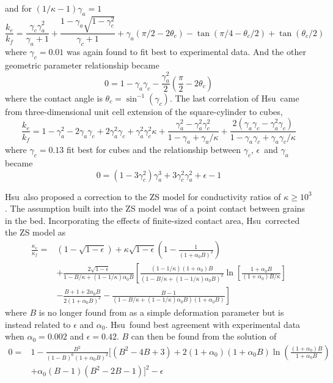 and for $(1/\kappa-1)\gamma_a=1$
\begin{equation}
    \frac{k_e}{k_f} = \frac{\gamma_c\gamma_a^2}{\gamma_a+1}+\frac{1-\gamma_a\sqrt{1-\gamma_c^2}}{\gamma_c+1}+\gamma_a(\pi/2-2\theta_c)-\tan(\pi/4-\theta_c/2)+\tan(\theta_c/2)
\end{equation}
where $\gamma_c = 0.01$ was again found to fit best to experimental data. And the other geometric parameter relationship became
\begin{equation}
    0 = 1-\gamma_a\gamma_c-\frac{\gamma_a^2}{2}\left(\frac{\pi}{2}-2\theta_c\right)
\end{equation}
where the contact angle is $\theta_c = \sin^{-1}(\gamma_c)$.
The last correlation of Hsu\etal~came from three-dimensional unit cell extension of the square-cylinder to cubes,
\begin{equation}
    \frac{k_e}{k_f} = 1-\gamma_a^2 - 2\gamma_a\gamma_c + 2\gamma_a^2\gamma_c + \gamma_a^2\gamma_c^2\kappa + \frac{\gamma_a^2-\gamma_a^2\gamma_c^2}{1-\gamma_a + \gamma_a/\kappa} + \frac{2(\gamma_a\gamma_c - \gamma_a^2\gamma_c)}{1-\gamma_a\gamma_c+\gamma_a\gamma_c/\kappa}
\end{equation}
where $\gamma_c = 0.13$ fit best for cubes and the relationship between $\gamma_c$, $\epsilon$\ and $\gamma_a$ became
\begin{equation}
    0 = (1-3\gamma_c^2)\gamma_a^3 + 3\gamma_c^2\gamma_a^2 + \epsilon - 1
\end{equation}

Hsu\etal~also proposed a correction to the ZS model for conductivity ratios of $\kappa \ge 10^3$. The assumption built into the ZS model was of a point contact between grains in the bed. Incorporating the effects of finite-sized contact area, Hsu\etal~corrected the ZS model as
\begin{equation}
\begin{split}
    \frac{\kappa_e}{\kappa_f}={} &(1-\sqrt{1-\epsilon}) + \kappa\sqrt{1-\epsilon}\left(1-\frac{1}{(1+\alpha_0B)^2}\right) \\
    & + \frac{2\sqrt{1-\epsilon}}{1-B/\kappa + (1-1/\kappa)\alpha_0B}\left[\frac{(1-1/\kappa)(1+\alpha_0)B}{(1-B/\kappa + (1-1/\kappa)\alpha_0B)^2}\ln\left[\frac{1+\alpha_0B}{(1+\alpha_0)B/\kappa}\right] \right.\\
    & - \left.\frac{B+1+2\alpha_0B}{2(1+\alpha_0B)^2} - \frac{B-1}{(1-B/\kappa+(1-1/\kappa)\alpha_0B)(1+\alpha_0B)} \right]
\end{split}
\end{equation}
where $B$ is no longer found from as a simple deformation parameter but is instead related to $\epsilon$ and $\alpha_0$. Hsu\etal~found best agreement with experimental data when $\alpha_0 = 0.002$ and $\epsilon=0.42$. $B$ can then be found from the solution of
\begin{equation}
\begin{split}
    0 ={} & 1-\frac{B^2}{(1-B)^6(1+\alpha_0B)^2}\bigg[(B^2-4B+3)+2(1+\alpha_0)(1+\alpha_0B)\ln\left(\frac{(1+\alpha_0)B}{1+\alpha_0B}\right)\\
    &+\alpha_0(B-1)(B^2-2B-1)\bigg]^2 - \epsilon
\end{split}
\end{equation}

